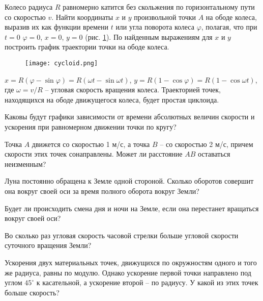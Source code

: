 \begin{ex} %
Колесо радиуса $R$ равномерно катится без скольжения по горизонтальному пути со скоростью $v$. Найти координаты $x$ и $y$ произвольной точки $A$ на ободе колеса, выразив их как функции времени $t$ или угла поворота колеса $\varphi$, полагая, что при $t = 0$ $\varphi = 0$, $x = 0$, $y = 0$ (рис. \ref{cycloid}). По найденным выражениям для $x$ и $y$ построить график траектории точки на ободе колеса.

\begin{figure}[h]
\centering
\texttt{[image: cycloid.png]}
\caption{}
\label{cycloid}
\end{figure}

\begin{ans}
$x= R(\varphi - \sin \varphi) = R(\omega t - \sin \omega t)$, $y=R(1-\cos \varphi) = R(1-\cos \omega t)$, где $\omega = v/R$ -- угловая скорость вращения колеса. Траекторией точек, находящихся на ободе движущегося колеса, будет простая циклоида.
\end{ans}
\end{ex}

\qualProblems

\begin{ex} %
Каковы будут графики зависимости от времени абсолютных величин скорости и ускорения при равномерном движении точки по кругу?
\end{ex}

\begin{ex}
Точка $A$ движется со скоростью 1 м/с, а точка $B$ – со скоростью 2 м/с, причем скорости этих точек
сонаправлены. Может ли расстояние $AB$ оставаться неизменным?
\end{ex}

\begin{ex}
Луна постоянно обращена к Земле одной стороной. Сколько оборотов совершит она вокруг своей оси за время полного оборота вокруг Земли?
\end{ex}

\begin{ex}
Будет ли происходить смена дня и ночи на Земле, если она перестанет вращаться вокруг своей оси?
\end{ex}

\begin{ex} 
Во сколько раз угловая скорость часовой стрелки больше угловой скорости суточного вращения Земли?
\end{ex}

\begin{ex} 
Ускорения двух материальных точек, движущихся по окружностям одного и того же радиуса, равны по модулю. Однако ускорение первой точки направлено под углом $45^{\circ}$ к касательной, а ускорение второй – по радиусу. У какой из этих точек больше скорость?
\end{ex}


